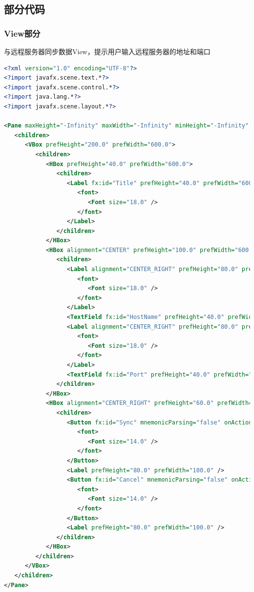 \documentclass[a4paper]{article}
\begin{document}
\subsection{部分代码}
    \subsubsection{View部分}
        与远程服务器同步数据View，提示用户输入远程服务器的地址和端口
        \begin{lstlisting}[language=xml]
<?xml version="1.0" encoding="UTF-8"?>
<?import javafx.scene.text.*?>
<?import javafx.scene.control.*?>
<?import java.lang.*?>
<?import javafx.scene.layout.*?>

<Pane maxHeight="-Infinity" maxWidth="-Infinity" minHeight="-Infinity" minWidth="-Infinity" prefHeight="200.0" prefWidth="600.0" xmlns="http://javafx.com/javafx/8" xmlns:fx="http://javafx.com/fxml/1" fx:controller="StarsRiver.Controller.SyncNetWorkController">
   <children>
      <VBox prefHeight="200.0" prefWidth="600.0">
         <children>
            <HBox prefHeight="40.0" prefWidth="600.0">
               <children>
                  <Label fx:id="Title" prefHeight="40.0" prefWidth="600.0" text="Sync NetWork">
                     <font>
                        <Font size="18.0" />
                     </font>
                  </Label>
               </children>
            </HBox>
            <HBox alignment="CENTER" prefHeight="100.0" prefWidth="600.0">
               <children>
                  <Label alignment="CENTER_RIGHT" prefHeight="80.0" prefWidth="100.0" text="http://">
                     <font>
                        <Font size="18.0" />
                     </font>
                  </Label>
                  <TextField fx:id="HostName" prefHeight="40.0" prefWidth="150.0" />
                  <Label alignment="CENTER_RIGHT" prefHeight="80.0" prefWidth="15.0" text=" : ">
                     <font>
                        <Font size="18.0" />
                     </font>
                  </Label>
                  <TextField fx:id="Port" prefHeight="40.0" prefWidth="150.0" />
               </children>
            </HBox>
            <HBox alignment="CENTER_RIGHT" prefHeight="60.0" prefWidth="600.0">
               <children>
                  <Button fx:id="Sync" mnemonicParsing="false" onAction="#Sync" prefHeight="40.0" prefWidth="80.0" text="Sync">
                     <font>
                        <Font size="14.0" />
                     </font>
                  </Button>
                  <Label prefHeight="80.0" prefWidth="100.0" />
                  <Button fx:id="Cancel" mnemonicParsing="false" onAction="#Cancel" prefHeight="40.0" prefWidth="80.0" text="Cancel">
                     <font>
                        <Font size="14.0" />
                     </font>
                  </Button>
                  <Label prefHeight="80.0" prefWidth="100.0" />
               </children>
            </HBox>
         </children>
      </VBox>
   </children>
</Pane>

        \end{lstlisting}
\end{document}
